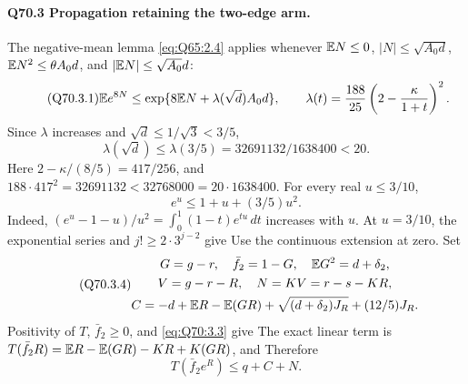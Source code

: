 \paragraph{Q70.3 Propagation retaining the two-edge arm.}
The negative-mean lemma \eqref{eq:Q65:2.4} applies whenever
\(\mathbb E N\le\allowbreak 0\), \(|N|\le\allowbreak \sqrt{A_0d}\),
\(\mathbb E N^2\le\allowbreak \theta A_0d\), and \(|\mathbb E N|\le\allowbreak \sqrt{A_0}d\):
\begin{equation}\tag{Q70.3.1}\label{eq:Q70:3.1}
\mathbb E e^{8N}\le\exp\{8\mathbb E N+\lambda(\sqrt d)A_0d\},\qquad
\lambda(t)=\frac{188}{25}\left(2-\frac{\kappa}{1+t}\right)^2.
\end{equation}
Since \(\lambda\) increases and \(\sqrt d\le\allowbreak 1/\sqrt3<\allowbreak 3/5\),
\begin{equation}\tag{Q70.3.2}\label{eq:Q70:3.2}
\lambda(\sqrt d)\le\lambda(3/5)=32691132/1638400<20.
\end{equation}
Here \(2-\kappa/(8/5)=\allowbreak 417/256\), and
\(188\cdot417^2=\allowbreak 32691132<\allowbreak 32768000=\allowbreak 20\cdot1638400\).
For every real \(u\le\allowbreak 3/10\),
\begin{equation}\tag{Q70.3.3}\label{eq:Q70:3.3}
e^u\le1+u+(3/5)u^2.
\end{equation}
Indeed, \((e^u-1-u)/u^2=\allowbreak \int_0^1(1-t)e^{tu}\,\allowbreak dt\) increases
with \(u\). At \(u=\allowbreak 3/10\), the exponential series and
\(j!\ge\allowbreak 2\cdot3^{j-2}\) give
Use the continuous extension at zero. Set
\begin{equation}\tag{Q70.3.4}\label{eq:Q70:3.4}
\begin{gathered}
G=g-r,\quad\bar f_2=1-G,\quad\mathbb E G^2=d+\delta_2,\\
V=g-r-R,\quad N=KV=r-s-KR,\\
C=-d+\mathbb E R-\mathbb E(GR)+\sqrt{(d+\delta_2)J_R}+(12/5)J_R.
\end{gathered}
\end{equation}
Positivity of \(T\), \(\bar f_2\ge\allowbreak 0\), and \eqref{eq:Q70:3.3} give
The exact linear term is
\(T(\bar f_2R)=\allowbreak \mathbb E R-\mathbb E(GR)-KR+K(GR)\), and
Therefore
\begin{equation}\tag{Q70.3.5}\label{eq:Q70:3.5}
T(\bar f_2e^R)\le q+C+N.
\end{equation}

